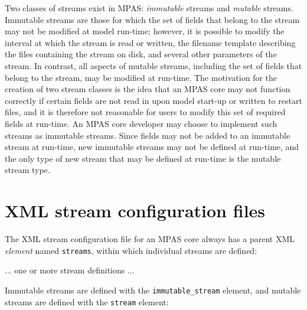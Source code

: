 Two classes of streams exist in MPAS: {\em immutable} streams and {\em mutable} streams. Immutable streams
are those for which the set of fields that belong to the stream may not be modified at model run-time; however, it is
possible to modify the interval at which the stream is read or written, the filename template describing the files
containing the stream on disk, and several other parameters of the stream. In contrast, all aspects of mutable streams,
including the set of fields that belong to the stream, may be modified at run-time. The motivation for the creation of
two stream classes is the idea that an MPAS core may not function correctly if certain fields are not read in upon 
model start-up or written to restart files, and it is therefore not reasonable for users to modify this set of required fields 
at run-time. An MPAS core developer may choose to implement such streams as immutable streams. Since fields may
not be added to an immutable stream at run-time, new immutable streams may not be defined at run-time, and the only 
type of new stream that may be defined at run-time is the mutable stream type.

\section{XML stream configuration files}
\label{sec:xml_stream_format} 

The XML stream configuration file for an MPAS core always has a parent XML {\em element} named {\tt streams}, within which 
individual streams are defined:

\vspace{12pt}
 \newline
\newline
\hspace*{1cm}... one or more stream definitions ... \newline
\newline
{} \newline
\vspace{12pt}

Immutable streams are defined with the {\tt immutable\_stream} element, and mutable streams are defined with the {\tt stream}
element: 

